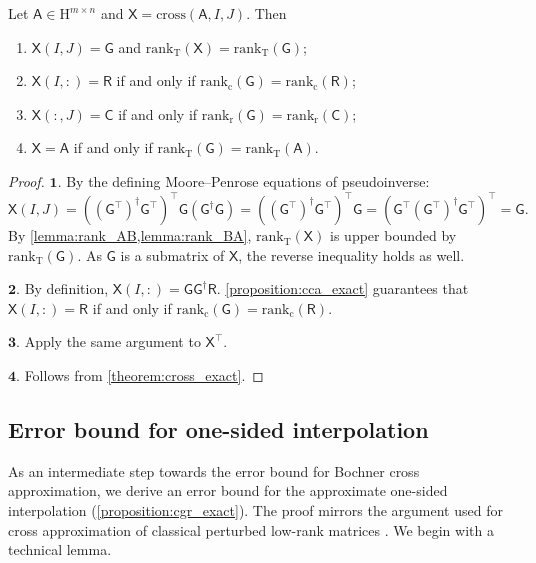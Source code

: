 \documentclass[onefignum,onetabnum]{siamart250211}
\renewenvironment{equation*}{\[}{\]\ignorespacesafterend}
\newcommand{\Hilb}{\mathrm{H}}
\newcommand{\Batrix}[1]{\bm{\Matrix{#1}}}
\newcommand{\Matrix}[1]{\mathsf{#1}}
\newcommand{\trans}{\intercal}
\newcommand{\pinv}{\dagger}
\newcommand{\Rank}[3][]{\mathrm{rank_{#2}} #1( #3 #1)}
\newcommand{\Index}[1]{{#1}}
\newcommand{\cross}[3][]{\mathrm{cross}#1(#2, #3 #1)}
\begin{document}
\begin{theorem}
\label{theorem:cross_interpol}
Let $\Batrix{A} \in \Hilb^{m \times n}$ and $\Batrix{X} = \cross{\Batrix{A}}{\Index{I}, \Index{J}}$.
Then
\begin{enumerate}
    \item $\Batrix{X}(\Index{I}, \Index{J}) = \Batrix{G}$ and $\Rank{T}{\Batrix{X}} = \Rank{T}{\Batrix{G}}$;
    \item $\Batrix{X}(\Index{I},:) = \Batrix{R}$ if and only if $\Rank{c}{\Batrix{G}} = \Rank{c}{\Batrix{R}}$;
    \item $\Batrix{X}(:,\Index{J}) = \Batrix{C}$ if and only if $\Rank{r}{\Batrix{G}} = \Rank{r}{\Batrix{C}}$;
    \item $\Batrix{X} = \Batrix{A}$ if and only if $\Rank{T}{\Batrix{G}} = \Rank{T}{\Batrix{A}}$.
\end{enumerate}
\end{theorem}
\begin{proof}
$\mathbf{1.}$
By the defining Moore--Penrose equations of pseudoinverse:
\begin{equation*}
    \Batrix{X}(\Index{I}, \Index{J}) = ((\Batrix{G}^\trans)^\pinv \Batrix{G}^\trans)^\trans \Batrix{G} (\Batrix{G}^\pinv \Batrix{G}) = ((\Batrix{G}^\trans)^\pinv \Batrix{G}^\trans)^\trans \Batrix{G} = (\Batrix{G}^\trans (\Batrix{G}^\trans)^\pinv \Batrix{G}^\trans)^\trans = \Batrix{G}.
\end{equation*}
By \cref{lemma:rank_AB,lemma:rank_BA}, $\Rank{T}{\Batrix{X}}$ is upper bounded by $\Rank{T}{\Batrix{G}}$.
As $\Batrix{G}$ is a submatrix of $\Batrix{X}$, the reverse inequality holds as well.

$\mathbf{2.}$
By definition, $\Batrix{X}(\Index{I},:) = \Batrix{G} \Batrix{G}^\pinv \Batrix{R}$.
\cref{proposition:cca_exact} guarantees that $\Batrix{X}(\Index{I},:) = \Batrix{R}$ if and only if $\Rank{c}{\Batrix{G}} = \Rank{c}{\Batrix{R}}$.

$\mathbf{3.}$
Apply the same argument to $\Batrix{X}^\trans$.

$\mathbf{4.}$ Follows from \cref{theorem:cross_exact}.
\end{proof}

\subsection{Error bound for one-sided interpolation}
As an intermediate step towards the error bound for Bochner cross approximation, we derive an error bound for the approximate one-sided interpolation (\cref{proposition:cgr_exact}).
The proof mirrors the argument used for cross approximation of classical perturbed low-rank matrices \cite{hamm2021perturbations}.
We begin with a technical lemma.
\end{document}
